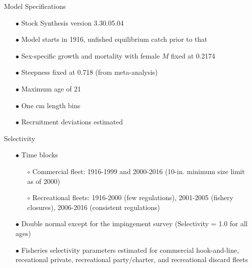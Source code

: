 \documentclass[ignorenonframetext,]{beamer}
\begin{document}
\begin{frame}{Model Specifications}

\begin{itemize}
\item[$\bullet$] Stock Synthesis version 3.30.05.04
\item[$\bullet$] Model starts in 1916, unfished equilibrium catch prior to that
\item[$\bullet$] Sex-specific growth and mortality with female $M$ fixed at 0.2174
\item[$\bullet$] Steepness fixed at 0.718 (from meta-analysis)
\item[$\bullet$] Maximum age of 21
\item[$\bullet$] One cm length bins
\item[$\bullet$] Recruitment deviations estimated
\end{itemize}

\end{frame}

\begin{frame}{Selectivity}

\begin{itemize}
\item[$\bullet$] Time blocks
\begin{itemize}
\item[$\circ$] Commercial fleet: 1916-1999 and 2000-2016 (10-in. minimum size limit as of 2000)
\item[$\circ$] Recreational fleets: 1916-2000 (few regulations), 2001-2005 (fishery closures), 2006-2016 (consistent regulations)
\end{itemize}
\item[$\bullet$] Double normal except for the impingement survey (Selectivity = 1.0 for all ages)
\item[$\bullet$] Fisheries selectivity parameters estimated for commercial hook-and-line, receational private, recreational party/charter, and recreational discard fleets
\end{itemize}

\end{frame}
\end{document}
